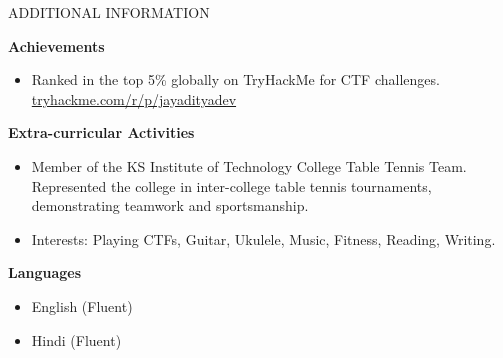 \documentclass{resume} %
\begin{document}
\begin{rSection}{ADDITIONAL INFORMATION}

    \textbf{Achievements}
    \begin{itemize}
        \item Ranked in the top 5\% globally on TryHackMe for CTF challenges. \\ \href{https://tryhackme.com/r/p/jayadityadev}{tryhackme.com/r/p/jayadityadev}
    \end{itemize}

    \vspace{0.2em}
    
    \textbf{Extra-curricular Activities}
    \begin{itemize}
        \item Member of the KS Institute of Technology College Table Tennis Team. \\
        Represented the college in inter-college table tennis tournaments, demonstrating teamwork and sportsmanship.
        \item Interests: Playing CTFs, Guitar, Ukulele, Music, Fitness, Reading, Writing.
    \end{itemize}

    \vspace{0.2em}
    
    \textbf{Languages}
    \begin{itemize}
        \item English (Fluent)
        \item Hindi (Fluent)
    \end{itemize}

\end{rSection}
\end{document}
